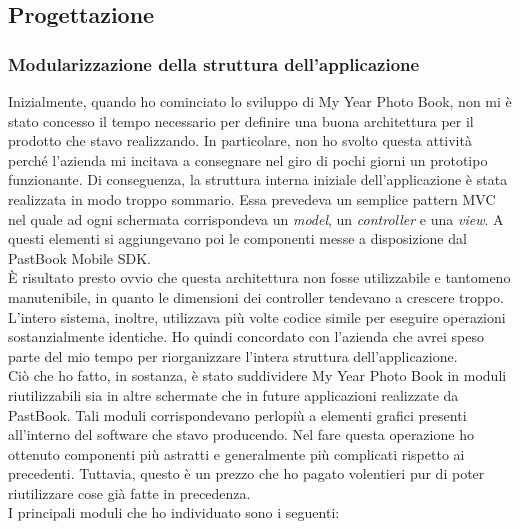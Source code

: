 		\subsection{Progettazione}
			\subsubsection{Modularizzazione della struttura dell'applicazione}
				Inizialmente, quando ho cominciato lo sviluppo di My Year Photo Book, non mi è stato concesso il tempo necessario per
				definire una buona architettura per il prodotto che stavo realizzando. In particolare, non ho svolto questa attività
				perché l'azienda mi incitava a consegnare nel giro di pochi giorni un prototipo funzionante. Di conseguenza, la
				struttura interna iniziale dell'applicazione è stata realizzata in modo troppo sommario. Essa prevedeva un semplice
				pattern MVC nel quale ad ogni schermata corrispondeva un \emph{model}, un \emph{controller} e una \emph{view}. A
				questi elementi si aggiungevano poi le componenti messe a disposizione dal PastBook Mobile SDK.\\
				È risultato presto ovvio che questa architettura non fosse utilizzabile e tantomeno manutenibile, in quanto le
				dimensioni dei controller tendevano a crescere troppo. L'intero sistema, inoltre, utilizzava più volte codice simile
				per eseguire operazioni sostanzialmente identiche. Ho quindi concordato con l'azienda che avrei speso parte del mio
				tempo per riorganizzare l'intera struttura dell'applicazione.\\
				Ciò che ho fatto, in sostanza, è stato suddividere My Year Photo Book in moduli riutilizzabili sia in altre schermate
				che in future applicazioni realizzate da PastBook. Tali moduli corrispondevano perlopiù a elementi grafici presenti
				all'interno del software che stavo producendo. Nel fare questa operazione ho ottenuto componenti più astratti e
				generalmente più complicati rispetto ai precedenti. Tuttavia, questo è un prezzo che ho pagato volentieri pur di
				poter riutilizzare cose già fatte in precedenza.\\
				I principali moduli che ho individuato sono i seguenti:
